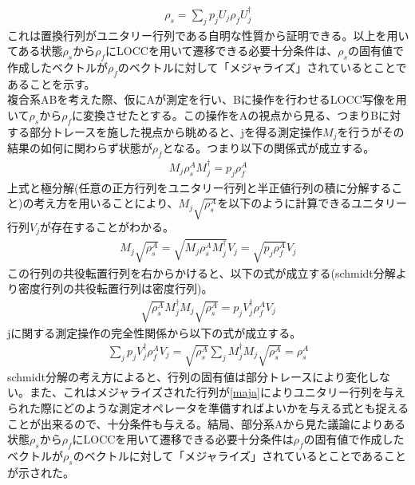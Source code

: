 \documentclass[a4paper,10.5pt]{article}
\numberwithin{equation}{section}
\begin{document}
\begin{equation}\begin{split}
    \rho_{s} = \sum_{j} p_{j} U_{j} \rho_{f} U_{j}^{\dagger} \label{maja}
\end{split} \end{equation}
これは置換行列がユニタリー行列である自明な性質から証明できる。以上を用いてある状態$\rho_{s}$から$\rho_{f}$にLOCCを用いて遷移できる必要十分条件は、$\rho_{s}$の固有値で作成したベクトルが$\rho_{f}$のベクトルに対して「メジャライズ」されているとことであることを示す。\\
複合系ABを考えた際、仮にAが測定を行い、Bに操作を行わせるLOCC写像を用いて$\rho_{s}$から$\rho_{f}$に変換させたとする。この操作をAの視点から見る、つまりBに対する部分トレースを施した視点から眺めると、jを得る測定操作$M_{j}$を行うがその結果の如何に関わらず状態が$\rho_{f}$となる。つまり以下の関係式が成立する。
\begin{equation}\begin{split}
    M_{j}\rho^{A}_{s}M_{j}^{\dagger}= p_{j} \rho^{A}_{f}
\end{split} \end{equation}
上式と極分解(任意の正方行列をユニタリー行列と半正値行列の積に分解すること)の考え方を用いることにより、$M_{j}\sqrt{\rho_{s}^{A}}$を以下のように計算できるユニタリー行列$V_{j}$が存在することがわかる。
\begin{equation}\begin{split}
    M_{j}\sqrt{\rho_{s}^{A}} =\sqrt{M_{j}\rho_{s}^{A}M_{j}^{\dagger}}V_{j}=\sqrt{p_{j} \rho^{A}_{f}}V_{j}
\end{split} \end{equation}
この行列の共役転置行列を右からかけると、以下の式が成立する(schmidt分解より密度行列の共役転置行列は密度行列)。
\begin{equation}\begin{split}
    \sqrt{\rho_{s}^{A}}M_{j}^{\dagger}M_{j}\sqrt{\rho_{s}^{A}}
    =p_{j}V_{j}^{\dagger}\rho_{f}^{A}V_{j}
\end{split} \end{equation}
jに関する測定操作の完全性関係から以下の式が成立する。
\begin{equation}\begin{split}
    \sum_{j}p_{j}V_{j}^{\dagger}\rho_{f}^{A}V_{j}
    =\sqrt{\rho_{s}^{A}}\sum_{j}M_{j}^{\dagger}M_{j}\sqrt{\rho_{s}^{A}}
    =\rho_{s}^{A}
\end{split} \end{equation}
schmidt分解の考え方によると、行列の固有値は部分トレースにより変化しない。また、これはメジャライズされた行列が\eqref{maja}によりユニタリー行列を与えられた際にどのような測定オペレータを準備すればよいかを与える式とも捉えることが出来るので、十分条件も与える。結局、部分系Aから見た議論によりある状態$\rho_{s}$から$\rho_{f}$にLOCCを用いて遷移できる必要十分条件は$\rho_{f}$の固有値で作成したベクトルが$\rho_{s}$のベクトルに対して「メジャライズ」されているとことであることが示された。\\
\end{document}
